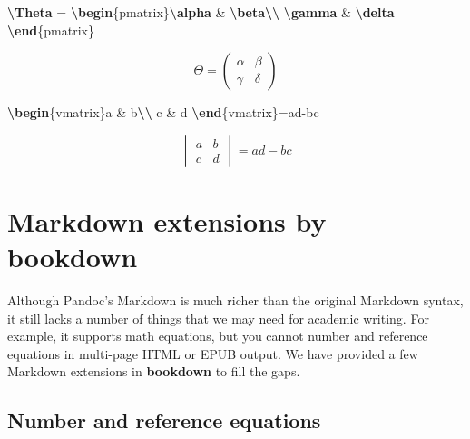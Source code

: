 \documentclass[
  12pt,
]{krantz}
\newenvironment{Shaded}{\begin{snugshade}}{\end{snugshade}}
\newcommand{\ExtensionTok}[1]{#1}
\newcommand{\KeywordTok}[1]{\textcolor[rgb]{0.13,0.29,0.53}{\textbf{#1}}}
\newcommand{\NormalTok}[1]{#1}
\newcommand{\SpecialCharTok}[1]{\textcolor[rgb]{0.81,0.36,0.00}{\textbf{#1}}}
\newcommand{\SpecialStringTok}[1]{\textcolor[rgb]{0.31,0.60,0.02}{#1}}
\theoremstyle{definition}
\theoremstyle{definition}
\theoremstyle{definition}
\theoremstyle{definition}
\theoremstyle{remark}
\begin{document}
\begin{Shaded}
\begin{Highlighting}[]
\SpecialStringTok{$$}\SpecialCharTok{\textbackslash{}Theta}\SpecialStringTok{ = }\KeywordTok{\textbackslash{}begin}\NormalTok{\{}\ExtensionTok{pmatrix}\NormalTok{\}}\SpecialCharTok{\textbackslash{}alpha}\SpecialStringTok{ \& }\SpecialCharTok{\textbackslash{}beta\textbackslash{}\textbackslash{}}
\SpecialCharTok{\textbackslash{}gamma}\SpecialStringTok{ \& }\SpecialCharTok{\textbackslash{}delta}
\KeywordTok{\textbackslash{}end}\NormalTok{\{}\ExtensionTok{pmatrix}\NormalTok{\}}\SpecialStringTok{$$}
\end{Highlighting}
\end{Shaded}

\[\Theta = \begin{pmatrix}\alpha & \beta\\
\gamma & \delta
\end{pmatrix}\]

\begin{Shaded}
\begin{Highlighting}[]
\SpecialStringTok{$$}\KeywordTok{\textbackslash{}begin}\NormalTok{\{}\ExtensionTok{vmatrix}\NormalTok{\}}\SpecialStringTok{a \& b}\SpecialCharTok{\textbackslash{}\textbackslash{}}
\SpecialStringTok{c \& d}
\KeywordTok{\textbackslash{}end}\NormalTok{\{}\ExtensionTok{vmatrix}\NormalTok{\}}\SpecialStringTok{=ad{-}bc$$}
\end{Highlighting}
\end{Shaded}

\[\begin{vmatrix}a & b\\
c & d
\end{vmatrix}=ad-bc\]

\section{Markdown extensions by bookdown}\label{markdown-extensions-by-bookdown}

Although Pandoc's Markdown is much richer than the original Markdown syntax, it still lacks a number of things that we may need for academic writing. For example, it supports math equations, but you cannot number and reference equations in multi-page HTML or EPUB output. We have provided a few Markdown extensions in \textbf{bookdown} to fill the gaps.

\subsection{Number and reference equations}\label{equations}
\end{document}
